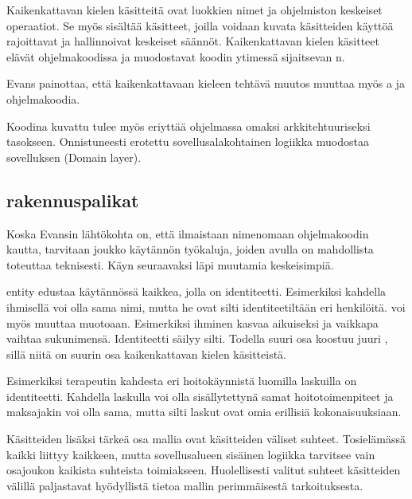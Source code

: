 Kaikenkattavan kielen käsitteitä ovat luokkien nimet ja ohjelmiston
keskeiset operaatiot. Se myös sisältää käsitteet, joilla voidaan kuvata
käsitteiden käyttöä rajoittavat ja hallinnoivat keskeiset säännöt.
Kaikenkattavan kielen käsitteet elävät ohjelmakoodissa ja muodostavat
koodin ytimessä sijaitsevan n.

Evans painottaa, että kaikenkattavaan kieleen tehtävä muutos muuttaa
myös a ja ohjelmakoodia.

Koodina kuvattu  tulee myös eriyttää
ohjelmassa omaksi arkkitehtuuriseksi tasokseen. Onnistuneesti erotettu
sovellusalakohtainen logiikka muodostaa sovelluksen
 (Domain layer).

\hypertarget{rakennuspalikat}{%
\subsection{\texorpdfstring{
rakennuspalikat}{ rakennuspalikat}}\label{rakennuspalikat}}

Koska Evansin lähtökohta on, että  ilmaistaan
nimenomaan ohjelmakoodin kautta, tarvitaan joukko käytännön työkaluja,
joiden avulla  on mahdollista toteuttaa
teknisesti. Käyn seuraavaksi läpi muutamia keskeisimpiä.

\Gls{entity} edustaa käytännössä kaikkea, jolla on identiteetti.
Esimerkiksi kahdella ihmisellä voi olla sama nimi, mutta he ovat silti
identiteetiltään eri henkilöitä.  voi myös muuttaa
muotoaan. Esimerkiksi ihminen kasvaa aikuiseksi ja vaikkapa vaihtaa
sukunimensä. Identiteetti säilyy silti. Todella suuri osa
 koostuu juuri
, sillä niitä on suurin osa
kaikenkattavan kielen käsitteistä.

Esimerkiksi terapeutin kahdesta eri hoitokäynnistä luomilla laskuilla on
identiteetti. Kahdella laskulla voi olla sisällytettynä samat
hoitotoimenpiteet ja maksajakin voi olla sama, mutta silti laskut ovat
omia erillisiä kokonaisuuksiaan.

Käsitteiden lisäksi tärkeä osa mallia ovat käsitteiden väliset suhteet.
Tosielämässä kaikki liittyy kaikkeen, mutta sovellusalueen sisäinen
logiikka tarvitsee vain osajoukon kaikista suhteista toimiakseen.
Huolellisesti valitut suhteet käsitteiden välillä paljastavat
hyödyllistä tietoa mallin perimmäisestä tarkoituksesta.


